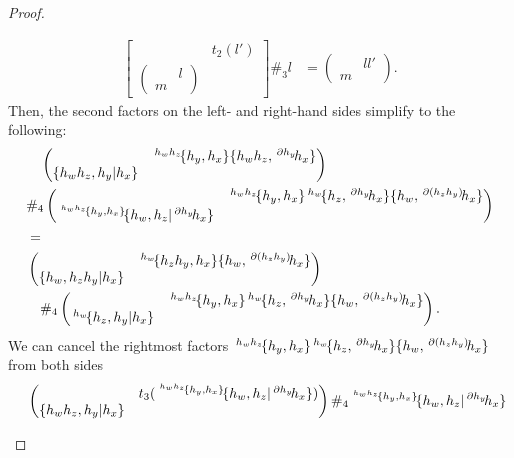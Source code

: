 \documentclass[11pt, reqno]{amsart} %
\newcommand{\act}[1]{\,\sp{#1}\!}
\theoremstyle{definition}
\theoremstyle{remark}
\numberwithin{equation}{section}
\begin{document}
\begin{proof}
\begin{enumerate}
\begin{align*}
    \begin{bmatrix}& t_2(l')\\\begin{pmatrix}& l\\ m &\end{pmatrix} &\end{bmatrix}\#_3l &= \begin{pmatrix}& ll'\\ m &\end{pmatrix}.
  \end{align*}
  Then, the second factors on the left- and right-hand sides simplify to the following:
  \begin{align*}
    &\quad 
    \begin{pmatrix}& \act{h_wh_z}\{h_y,h_x\}\{h_wh_z,\act{\partial h_y}h_x\}\\ \{h_wh_z,h_y|h_x\}& \end{pmatrix}
    \\
    & \#_4
    \begin{pmatrix} & \act{h_wh_z}\{h_y,h_x\}\act{h_w}\{h_z,\act{\partial h_y}h_x\}\{h_w,\act{\partial (h_zh_y)}h_x\}\\ \act{\act{h_wh_z}\{h_y,h_x\}}\{h_w,h_z|\act{\partial h_y}h_x\}&\end{pmatrix} \\
    &= \\
    &
    \begin{pmatrix} & \act{h_w}\{h_zh_y,h_x\}\{h_w,\act{\partial(h_zh_y)}h_x\}\\\{h_w,h_zh_y|h_x\} &\end{pmatrix} \\
    &\quad \#_4
    \begin{pmatrix}& \act{h_wh_z}\{h_y,h_x\}\act{h_w}\{h_z,\act{\partial h_y}h_x\}\{h_w,\act{\partial (h_zh_y)}h_x\}\\ \act{h_w}\{h_z,h_y|h_x\} &\end{pmatrix}.
  \end{align*}
  We can cancel the rightmost factors $\act{h_wh_z}\{h_y,h_x\}\act{h_w}\{h_z,\act{\partial h_y}h_x\}\{h_w,\act{\partial (h_zh_y)}h_x\}$ from both sides
  \begin{align*}
    &\quad 
    \begin{pmatrix}& t_3(\act{\act{h_wh_z}\{h_y,h_x\}}\{h_w,h_z|\act{\partial h_y}h_x\})\\ \{h_wh_z,h_y|h_x\}& \end{pmatrix}
    \#_4
    \act{\act{h_wh_z}\{h_y,h_x\}}\{h_w,h_z|\act{\partial h_y}h_x\} \\

\end{align*}
\end{enumerate}
\end{proof}
\end{document}
